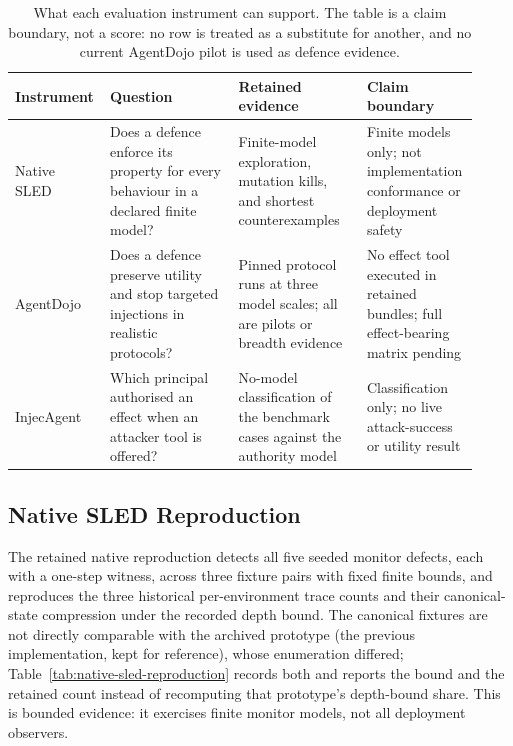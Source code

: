 \documentclass[11pt]{article}
\begin{document}
\begin{table}[t]
\centering
\small
\begin{tabular}{@{}p{0.18\linewidth}p{0.27\linewidth}p{0.27\linewidth}p{0.20\linewidth}@{}}
\toprule
Instrument & Question & Retained evidence & Claim boundary \\
\midrule
Native SLED & Does a defence enforce its property for every behaviour in a declared finite model? & Finite-model exploration, mutation kills, and shortest counterexamples & Finite models only; not implementation conformance or deployment safety \\
AgentDojo & Does a defence preserve utility and stop targeted injections in realistic protocols? & Pinned protocol runs at three model scales; all are pilots or breadth evidence & No effect tool executed in retained bundles; full effect-bearing matrix pending \\
InjecAgent & Which principal authorised an effect when an attacker tool is offered? & No-model classification of the benchmark cases against the authority model & Classification only; no live attack-success or utility result \\
\bottomrule
\end{tabular}
\caption{What each evaluation instrument can support. The table is a claim
boundary, not a score: no row is treated as a substitute for another, and
no current AgentDojo pilot is used as defence evidence.}
\label{tab:benchmark-boundaries}
\end{table}

\subsection{Native SLED Reproduction}

The retained native reproduction detects all five seeded monitor defects,
each with a one-step witness, across three fixture pairs with fixed finite
bounds, and reproduces the three historical per-environment trace counts and
their canonical-state compression under the recorded depth bound. The
canonical fixtures are not directly comparable with the archived prototype
(the previous implementation, kept for reference), whose enumeration differed;
Table~\ref{tab:native-sled-reproduction} records both and reports the bound
and the retained count instead of recomputing that prototype's depth-bound
share. This is bounded evidence: it exercises finite
monitor models, not all deployment observers.


\end{document}
